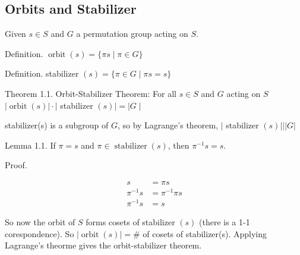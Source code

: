 


\subsection{Orbits and Stabilizer}

Given $s \in S$ and $G$ a permutation group acting on $S$.

Definition. $\operatorname{orbit}(s)=\{\pi s \mid \pi \in G\}$

Definition. stabilizer $(s)=\{\pi \in G \mid \pi s=s\}$

Theorem 1.1. Orbit-Stabilizer Theorem: For all $s \in S$ and $G$ acting on $S$ $|\operatorname{orbit}(s)| \cdot \mid$ stabilizer $(s)|=| G \mid$

stabilizer(s) is a subgroup of $G$, so by Lagrange's theorem, $\mid$ stabilizer $(s)|||G|$

Lemma 1.1. If $\pi=s$ and $\pi \in \operatorname{stabilizer}(s)$, then $\pi^{-1} s=s$.

Proof.

$$
\begin{aligned}
s & =\pi s \\
\pi^{-1} s & =\pi^{-1} \pi s \\
\pi^{-1} s & =s
\end{aligned}
$$

So now the orbit of $S$ forms cosets of stabilizer $(s)$ (there is a 1-1 corespondence). So $|\operatorname{orbit}(s)|=\#$ of cosets of stabilizer(s). Applying Lagrange's theorme gives the orbit-stabilizer theorem.
